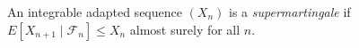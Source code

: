 
An integrable adapted sequence $(X_n)$ is a \emph{supermartingale} if $E[X_{n+1}\mid\mathcal F_n]\le X_n$ almost surely for all $n$.
